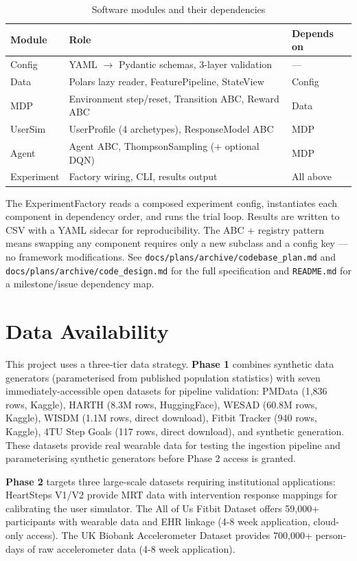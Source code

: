 \documentclass[11pt,a4paper]{article}
\begin{document}
\begin{table}[H]
\centering
\caption{Software modules and their dependencies}
\begin{tabular}{lll}
\toprule
Module & Role & Depends on \\
\midrule
Config & YAML $\rightarrow$ Pydantic schemas, 3-layer validation & --- \\
Data & Polars lazy reader, FeaturePipeline, StateView & Config \\
MDP & Environment step/reset, Transition ABC, Reward ABC & Data \\
UserSim & UserProfile (4 archetypes), ResponseModel ABC & MDP \\
Agent & Agent ABC, ThompsonSampling (+ optional DQN) & MDP \\
Experiment & Factory wiring, CLI, results output & All above \\
\bottomrule
\end{tabular}
\end{table}

The ExperimentFactory reads a composed experiment config, instantiates
each component in dependency order, and runs the trial loop. Results are
written to CSV with a YAML sidecar for reproducibility. The ABC + registry
pattern means swapping any component requires only a new subclass and a
config key --- no framework modifications. See
\texttt{docs/plans/archive/codebase\_plan.md} and \texttt{docs/plans/archive/code\_design.md}
for the full specification and \texttt{README.md} for a milestone/issue
dependency map.

\section{Data Availability}
\label{sec:data}

This project uses a three-tier data strategy. \textbf{Phase 1} combines synthetic data generators (parameterised from published population statistics) with seven immediately-accessible open datasets for pipeline validation: PMData (1,836 rows, Kaggle), HARTH (8.3M rows, HuggingFace), WESAD (60.8M rows, Kaggle), WISDM (1.1M rows, direct download), Fitbit Tracker (940 rows, Kaggle), 4TU Step Goals (117 rows, direct download), and synthetic generation. These datasets provide real wearable data for testing the ingestion pipeline and parameterising synthetic generators before Phase 2 access is granted.

\textbf{Phase 2} targets three large-scale datasets requiring institutional applications: HeartSteps V1/V2 \cite{klasnja2019heartsteps,klasnja2022heartsteps} provide MRT data with intervention response mappings for calibrating the user simulator. The All of Us Fitbit Dataset \cite{patten2026allofus} offers 59,000+ participants with wearable data and EHR linkage (4-8 week application, cloud-only access). The UK Biobank Accelerometer Dataset \cite{williamson2024ukbiobank} provides 700,000+ person-days of raw accelerometer data (4-8 week application).
\end{document}
